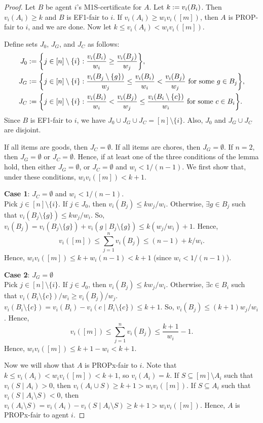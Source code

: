 \begin{proof}
Let $B$ be agent $i$'s M1S-certificate for $A$. Let $k := v_i(B_i)$.
Then $v_i(A_i) \ge k$ and $B$ is EF1-fair to $i$.
If $v_i(A_i) \ge w_iv_i([m])$, then $A$ is PROP-fair to $i$, and we are done.
Now let $k \le v_i(A_i) < w_iv_i([m])$.

Define sets $J_0$, $J_G$, and $J_C$ as follows:
\ifColsTwo\providecommand{\tempWrap}{\\ &\qquad\qquad}\else\let\tempWrap\relax\fi
\begin{align*}
J_0 &\defeq \bigg\{j \in [n] \setminus \{i\}: \frac{v_i(B_i)}{w_i} \ge \frac{v_i(B_j)}{w_j} \bigg\},
\\ J_G &\defeq \bigg\{j \in [n] \setminus \{i\}: \frac{v_i(B_j \setminus \{g\})}{w_j}
    \tempWrap\le \frac{v_i(B_i)}{w_i} < \frac{v_i(B_j)}{w_j} \text{ for some } g \in B_j \bigg\},
\\ J_C &\defeq \bigg\{j \in [n] \setminus \{i\}: \frac{v_i(B_i)}{w_i} < \frac{v_i(B_j)}{w_j}
    \tempWrap\le \frac{v_i(B_i \setminus \{c\})}{w_i} \text{ for some } c \in B_i \bigg\}.
\end{align*}
Since $B$ is EF1-fair to $i$, we have $J_0 \cup J_G \cup J_C = [n] \setminus \{i\}$.
Also, $J_0$ and $J_G \cup J_C$ are disjoint.

If all items are goods, then $J_C = \emptyset$.
If all items are chores, then $J_G = \emptyset$.
If $n = 2$, then $J_G = \emptyset$ or $J_C = \emptyset$.
Hence, if at least one of the three conditions of the lemma hold,
then either $J_G = \emptyset$, or $J_C = \emptyset$ and $w_i < 1/(n-1)$.
We first show that, under these conditions, $w_iv_i([m]) < k + 1$.

\textbf{Case 1}: $J_C = \emptyset$ and $w_i < 1/(n-1)$.
\\ Pick $j \in [n] \setminus \{i\}$.
If $j \in J_0$, then $v_i(B_j) \le kw_j/w_i$.
Otherwise, $\exists g \in B_j$ such that $v_i(B_j \setminus \{g\}) \le kw_j/w_i$.
So, $v_i(B_j) = v_i(B_j \setminus \{g\}) + v_i(g \mid B_j \setminus \{g\}) \le k(w_j/w_i) + 1$.
Hence,
\[ v_i([m]) \le \sum_{j=1}^n v_i(B_j) \le (n-1) + k/w_i. \]
Hence, $w_iv_i([m]) \le k + w_i(n-1) < k + 1$ (since $w_i < 1/(n-1)$).

\textbf{Case 2}: $J_G = \emptyset$
\\ Pick $j \in [n] \setminus \{i\}$.
If $j \in J_0$, then $v_i(B_j) \le kw_j/w_i$.
Otherwise, $\exists c \in B_i$ such that $v_i(B_i \setminus \{c\})/w_i \ge v_i(B_j)/w_j$.
$v_i(B_i \setminus \{c\}) = v_i(B_i) - v_i(c \mid B_i \setminus \{c\}) \le k + 1$.
So, $v_i(B_j) \le (k+1)w_j/w_i$. Hence,
\[ v_i([m]) \le \sum_{j=1}^n v_i(B_j) \le \frac{k+1}{w_i} - 1. \]
Hence, $w_iv_i([m]) \le k+1 - w_i < k + 1$.

Now we will show that $A$ is PROPx-fair to $i$.
Note that $k \le v_i(A_i) < w_iv_i([m]) < k + 1$, so $v_i(A_i) = k$.
If $S \subseteq [m] \setminus A_i$ such that $v_i(S \mid A_i) > 0$,
then $v_i(A_i \cup S) \ge k + 1 > w_iv_i([m])$.
If $S \subseteq A_i$ such that $v_i(S \mid A_i \setminus S) < 0$,
then $v_i(A_i \setminus S) = v_i(A_i) - v_i(S \mid A_i \setminus S) \ge k + 1 > w_iv_i([m])$.
Hence, $A$ is PROPx-fair to agent $i$.
\end{proof}

